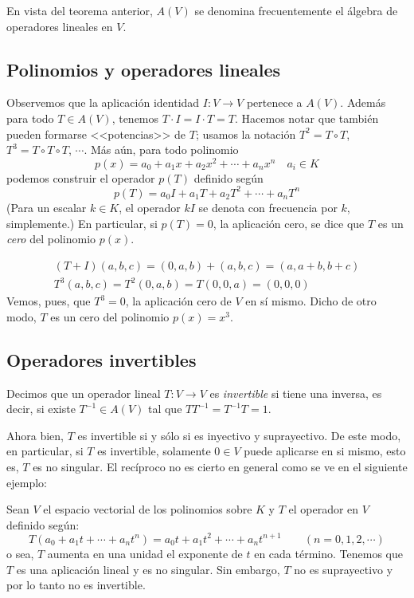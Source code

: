 En vista del teorema anterior, \(A(V)\) se denomina frecuentemente el álgebra de operadores lineales en \(V\).

\subsection{Polinomios y operadores lineales}

Observemos que la aplicación identidad \(I:V\rightarrow V\) pertenece a \(A(V)\). Además para todo \(T\in A(V)\), tenemos \(T\cdot I = I \cdot T = T\). Hacemos notar que también pueden formarse <<potencias>> de \(T\); usamos la notación \(T^2=T \circ T\), \(T^3=T\circ T \circ T\), \(\cdots\). Más aún, para todo polinomio
\[
  p(x) = a_0 + a_1 x + a_2 x^2 + \cdots + a_n x^n \quad a_i \in K
\]
podemos construir el operador \(p(T)\) definido según
\[
  p(T) = a_0 I + a_1 T + a_2 T^2 + \cdots + a_n T^n
\]
(Para un escalar \(k \in K\), el operador \(kI\) se denota con frecuencia por \(k\), simplemente.) En particular, si \(p(T)=0\), la aplicación cero, se dice que \(T\) es un \textit{cero} del polinomio \(p(x)\).

\begin{align*}
  (T+I)(a,b,c) = (0,a,b) + (a,b,c) = (a,a+b,b+c) \\
  T^3(a,b,c) = T^2(0,a,b) = T(0,0,a) = (0,0,0)
\end{align*}
Vemos, pues, que \(T^3 = 0\), la aplicación cero de \(V\) en sí mismo. Dicho de otro modo, \(T\) es un cero del polinomio \(p(x)=x^3\).

\subsection{Operadores invertibles}

Decimos que un operador lineal \(T:V\rightarrow V\) es \textit{invertible} si tiene una inversa, es decir, si existe \(T^{-1}\in A(V)\) tal que \(TT^{-1} = T^{-1}T = 1\).

Ahora bien, \(T\) es invertible si y sólo si es inyectivo y suprayectivo. De este modo, en particular, si \(T\) es invertible, solamente \(0\in V\) puede aplicarse en si  mismo, esto es, \(T\) es no singular. El recíproco no es cierto en general como se ve en el siguiente ejemplo:

\ejemplo

Sean \(V\) el espacio vectorial de los polinomios sobre \(K\) y \(T\) el operador en \(V\) definido según:
\[
  T(a_0 + a_1t + \cdots + a_n t^n) = a_0t + a_1 t^2 + \cdots + a_n t^{n+1} \qquad (n=0,1,2,\cdots)
\]
o sea, \(T\) aumenta en una unidad el exponente de \(t\) en cada término. Tenemos que \(T\) es una aplicación lineal y es no singular. Sin embargo, \(T\) no es suprayectivo y por lo tanto no es invertible.

